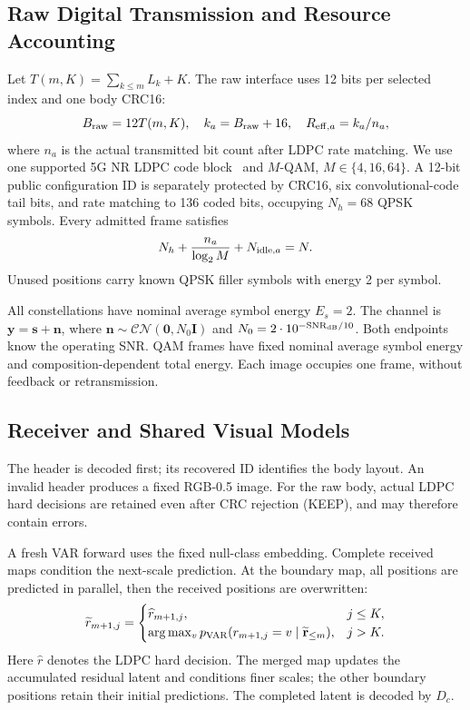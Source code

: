\documentclass[journal]{IEEEtran}
\begin{document}
\subsection{Raw Digital Transmission and Resource Accounting}
Let $T(m,K)=\sum_{k\le m}L_k+K$. The raw interface uses 12 bits per selected index and one body CRC16:
\begin{equation}
B_{\rm raw}=12T(m,K),\quad k_a=B_{\rm raw}+16,\quad
R_{{\rm eff},a}=k_a/n_a,
\label{eq:raw}
\end{equation}
where $n_a$ is the actual transmitted bit count after LDPC rate matching. We use one supported 5G NR LDPC code block~\cite{3gpp38212} and $M$-QAM, $M\in\{4,16,64\}$. A 12-bit public configuration ID is separately protected by CRC16, six convolutional-code tail bits, and rate matching to 136 coded bits, occupying $N_h=68$ QPSK symbols. Every admitted frame satisfies
\begin{equation}
N_h+\frac{n_a}{\log_2 M}+N_{{\rm idle},a}=N.
\label{eq:budget}
\end{equation}
Unused positions carry known QPSK filler symbols with energy 2 per symbol.

All constellations have nominal average symbol energy $E_s=2$. The channel is $\mathbf y=\mathbf s+\mathbf n$, where $\mathbf n\sim\mathcal{CN}(\mathbf0,N_0\mathbf I)$ and $N_0=2\cdot10^{-\mathrm{SNR}_{\rm dB}/10}$. Both endpoints know the operating SNR. QAM frames have fixed nominal average symbol energy and composition-dependent total energy. Each image occupies one frame, without feedback or retransmission.

\subsection{Receiver and Shared Visual Models}
The header is decoded first; its recovered ID identifies the body layout. An invalid header produces a fixed RGB-0.5 image. For the raw body, actual LDPC hard decisions are retained even after CRC rejection (KEEP), and may therefore contain errors.

A fresh VAR forward uses the fixed null-class embedding. Complete received maps condition the next-scale prediction. At the boundary map, all positions are predicted in parallel, then the received positions are overwritten:
\begin{equation}
\widetilde r_{m+1,j}=\begin{cases}
\widehat r_{m+1,j},&j\le K,\\
\arg\max_v p_{\rm VAR}(r_{m+1,j}=v\mid\widetilde{\mathbf r}_{\le m}),&j>K.
\end{cases}
\label{eq:overwrite}
\end{equation}
Here $\widehat r$ denotes the LDPC hard decision. The merged map updates the accumulated residual latent and conditions finer scales; the other boundary positions retain their initial predictions. The completed latent is decoded by $D_c$.
\end{document}
